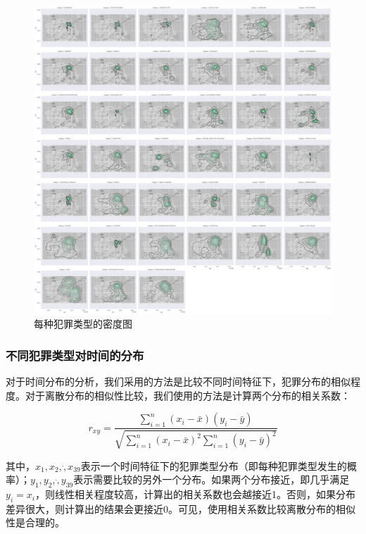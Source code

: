 \begin{figure}[!bt]
    \centering
    \includegraphics[width=1.0\linewidth]{fig/category_density}
    \caption{每种犯罪类型的密度图}
    \label{fig:tot_category}
\end{figure}

\newpage

\subsubsection{不同犯罪类型对时间的分布}

对于时间分布的分析，我们采用的方法是比较不同时间特征下，犯罪分布的相似程度。对于离散分布的相似性比较，我们使用的方法是计算两个分布的相关系数：

\begin{equation*}
r_{xy}=\frac{\sum^n_{i=1}(x_i-\bar{x})(y_i-\bar{y})}{\sqrt{\sum^n_{i=1}(x_i-\bar{x})^2\sum^n_{i=1}(y_i-\bar{y})^2}}
\end{equation*}

其中，$x_1, x_2, \dot, x_{39}$表示一个时间特征下的犯罪类型分布（即每种犯罪类型发生的概率）；$y_1, y_2, \dot, y_{39}$表示需要比较的另外一个分布。如果两个分布接近，即几乎满足$y_i=x_i$，则线性相关程度较高，计算出的相关系数也会越接近1。否则，如果分布差异很大，则计算出的结果会更接近0。可见，使用相关系数比较离散分布的相似性是合理的。

